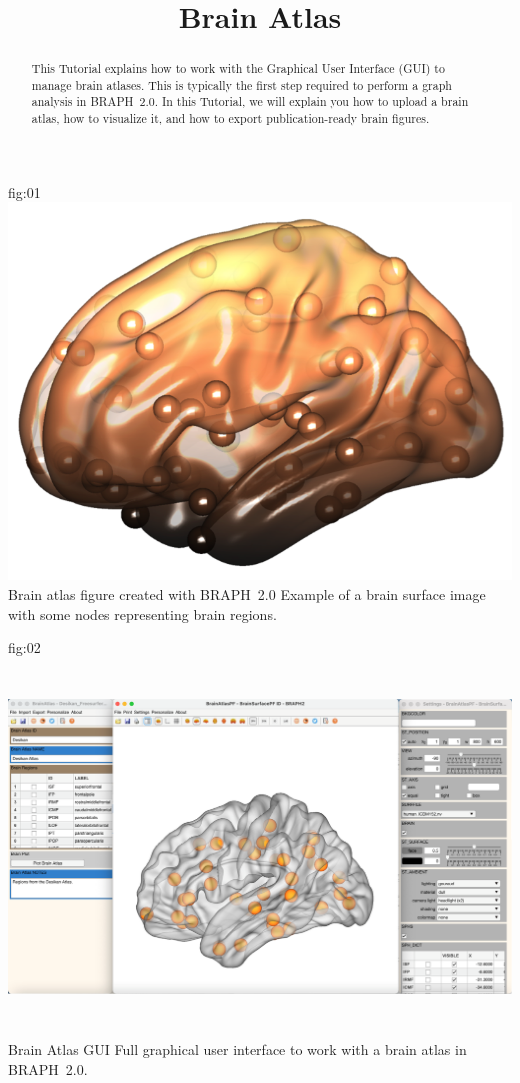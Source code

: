 \documentclass[justified]{tufte-handout}
\title{Brain Atlas}
\begin{document}
\maketitle
	
	{fig:01}
	{\includegraphics{fig01.png}}
	{Brain atlas figure created with BRAPH~2.0}
	{
	Example of a brain surface image with some nodes representing brain regions.
	}

\begin{abstract}
\noindent
This Tutorial explains how to work with the Graphical User Interface (GUI) to manage brain atlases.
This is typically the first step required to perform a graph analysis in BRAPH~2.0. 
In this Tutorial, we will explain you how to upload a brain atlas, how to visualize it, and how to export publication-ready brain figures.
\end{abstract}

\tableofcontents

	{fig:02}
	{\includegraphics[height=10cm]{fig02.png}}
	{Brain Atlas GUI}
	{
	Full graphical user interface to work with a brain atlas in BRAPH~2.0. 
	}
\end{document}
